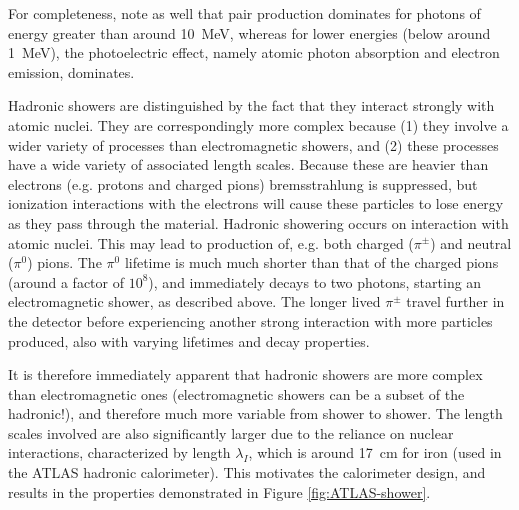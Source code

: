For completeness, note as well that pair production dominates for photons of energy greater than around \SI{10}{\MeV}, 
whereas for lower energies (below around \SI{1}{\MeV}), the photoelectric effect, namely atomic photon absorption and electron emission, dominates.

Hadronic showers are distinguished by the fact that they interact strongly with atomic nuclei. They are 
correspondingly more complex because (1) they involve a wider variety of processes than electromagnetic 
showers, and (2) these processes have a wide variety of associated length scales. Because these are 
heavier than electrons (e.g. protons and charged pions) bremsstrahlung is suppressed, but ionization interactions 
with the electrons will cause these particles to lose energy as they pass through the material. Hadronic 
showering occurs on interaction with atomic nuclei. This may lead to production of, e.g. both charged ($\pi^{\pm}$)
and neutral ($\pi^{0}$) pions. The $\pi^{0}$ lifetime is much much shorter than that of the charged pions (around 
a factor of $10^8$), and immediately decays to two photons, starting an electromagnetic shower, as described 
above. The longer lived $\pi^{\pm}$ travel further in the detector before experiencing another strong interaction 
with more particles produced, also with varying lifetimes and decay properties. 

It is therefore immediately apparent that hadronic showers are more complex than electromagnetic ones 
(electromagnetic showers can be a subset of the hadronic!), and therefore much more variable from shower 
to shower. The length scales involved are also significantly larger due to the reliance on nuclear interactions,
characterized by length $\lambda_{I}$, which is around \SI{17}{\cm} for iron (used in the ATLAS hadronic calorimeter). 
This motivates the calorimeter design, and results in the properties demonstrated in Figure \ref{fig:ATLAS-shower}.